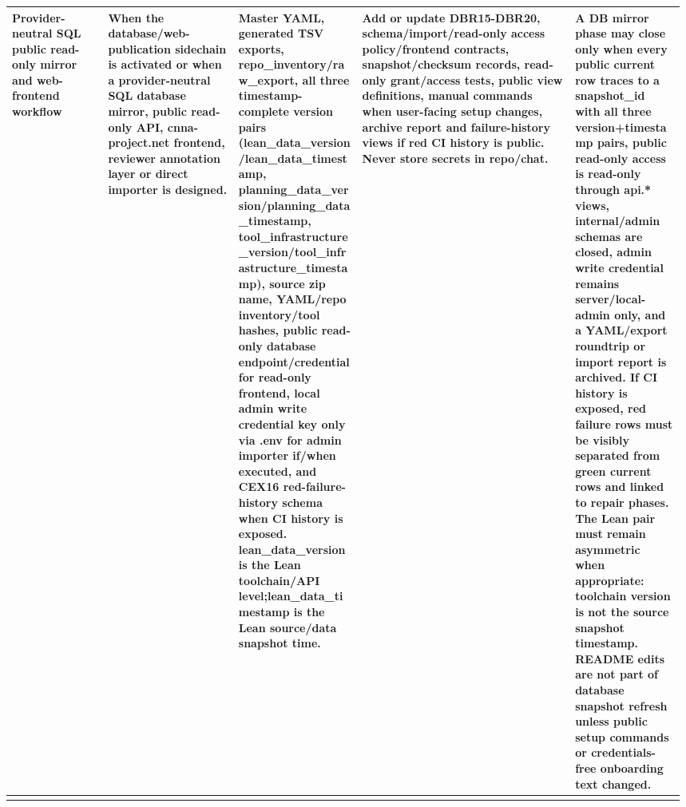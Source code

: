 \begin{longtable}{L{0.14\linewidth} L{0.19\linewidth} L{0.18\linewidth} L{0.31\linewidth} L{0.16\linewidth}}
Provider-neutral SQL public read-only mirror and web-frontend workflow & When the database/\allowbreak{}web-publication sidechain is activated or when a provider-neutral SQL database mirror, public read-only API, cnna-project.net frontend, reviewer annotation layer or direct importer is designed. & Master YAML, generated TSV exports, repo\_inventory/\allowbreak{}raw\_export, all three timestamp-complete version pairs (lean\_data\_version/\allowbreak{}lean\_data\_timestamp, planning\_data\_version/\allowbreak{}planning\_data\_timestamp, tool\_infrastructure\_version/\allowbreak{}tool\_infrastructure\_timestamp), source zip name, YAML/\allowbreak{}repo inventory/\allowbreak{}tool hashes, public read-only database endpoint/\allowbreak{}credential for read-only frontend, local admin write credential key only via .env for admin importer if/\allowbreak{}when executed, and CEX16 red-failure-history schema when CI history is exposed. lean\_data\_version is the Lean toolchain/\allowbreak{}API level;\newline lean\_data\_timestamp is the Lean source/\allowbreak{}data snapshot time. & Add or update DBR15-DBR20, schema/\allowbreak{}import/\allowbreak{}read-only access policy/\allowbreak{}frontend contracts, snapshot/\allowbreak{}checksum records, read-only grant/\allowbreak{}access tests, public view definitions, manual commands when user-facing setup changes, archive report and failure-history views if red CI history is public. Never store secrets in repo/\allowbreak{}chat. & A DB mirror phase may close only when every public current row traces to a snapshot\_id with all three version+timestamp pairs, public read-only access is read-only through api.* views, internal/\allowbreak{}admin schemas are closed, admin write credential remains server/\allowbreak{}local-admin only, and a YAML/\allowbreak{}export roundtrip or import report is archived. If CI history is exposed, red failure rows must be visibly separated from green current rows and linked to repair phases. The Lean pair must remain asymmetric when appropriate: toolchain version is not the source snapshot timestamp. README edits are not part of database snapshot refresh unless public setup commands or credentials-free onboarding text changed.\\
\hline
\addlinespace[0.24em]

\end{longtable}
